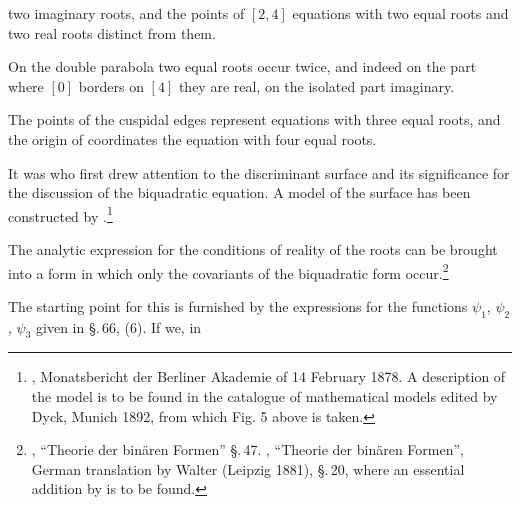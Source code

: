 two imaginary roots, and the points of $[2, 4]$ equations with two equal roots and two real roots distinct from them.

On the double parabola two equal roots occur twice, and indeed on the part where $[0]$ borders on $[4]$ they are real, on the isolated part imaginary.


The points of the cuspidal edges represent equations with three equal roots, and the origin of coordinates the equation with four equal roots.

It was  who first drew attention to the discriminant surface and its significance for the discussion of the biquadratic equation. A model of the surface has been constructed by .\footnote{, Monatsbericht der Berliner Akademie of 14 February 1878. A description of the model is to be found in the catalogue of mathematical models edited by Dyck, Munich 1892, from which Fig. 5 above is taken.}

The analytic expression for the conditions of reality of the roots can be brought into a form in which only the covariants of the biquadratic form occur.\footnote{, ``Theorie der binären Formen'' \S.\,47. , ``Theorie der binären Formen'', German translation by Walter (Leipzig 1881), \S.\,20, where an essential addition by  is to be found.}

The starting point for this is furnished by the expressions for the functions $\psi_1$, $\psi_2$, $\psi_3$ given in \S.\,66, (6). If we, in
